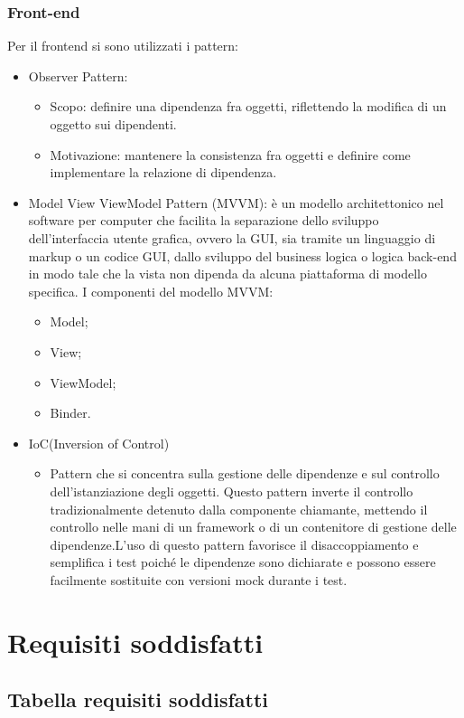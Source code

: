 \documentclass[12pt]{article}
\begin{document}
\subsubsection{Front-end}
Per il frontend si sono utilizzati i pattern:
\begin{itemize}
	\item Observer Pattern:
	\begin{itemize}
		\item Scopo: definire una dipendenza fra oggetti, riflettendo la modifica di un oggetto sui dipendenti.
		\item Motivazione: mantenere la consistenza fra oggetti e definire come implementare la relazione di dipendenza.
	\end{itemize}
	\item Model View ViewModel Pattern (MVVM): è un modello architettonico nel software per computer che facilita la separazione dello sviluppo dell'interfaccia utente grafica, ovvero la GUI,
sia tramite un linguaggio di markup o un codice GUI, dallo sviluppo del business logica o logica back-end in modo tale che la vista non dipenda da alcuna piattaforma di modello specifica.
I componenti del modello MVVM:	
	\begin{itemize}
		\item Model;
		\item View;
		\item ViewModel;
		\item Binder.
	\end{itemize}
\item IoC(Inversion of Control)
	\begin{itemize}
		\item Pattern che si concentra sulla gestione delle dipendenze e sul controllo dell'istanziazione degli oggetti. Questo pattern inverte il controllo tradizionalmente detenuto dalla 				componente chiamante, mettendo il controllo nelle mani di un framework o di un contenitore di gestione delle dipendenze.L'uso di questo pattern favorisce il disaccoppiamento e 				semplifica i test poiché le dipendenze sono dichiarate e possono essere facilmente sostituite con versioni mock durante i test.
	\end{itemize}
\end{itemize}
 	
\section{Requisiti soddisfatti}
\subsection{Tabella requisiti soddisfatti}
\end{document}

